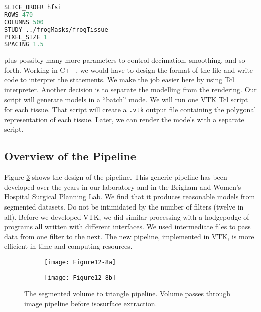 \begin{lstlisting}[language=TCL, caption={User specified parameters to control the elements of the pipeline.}]
SLICE_ORDER hfsi
ROWS 470
COLUMNS 500
STUDY ../frogMasks/frogTissue
PIXEL_SIZE 1
SPACING 1.5
\end{lstlisting}

plus possibly many more parameters to control decimation, smoothing, and so forth. Working in C++, we would have to design the format of the file and write code to interpret the statements. We make the job easier here by using Tcl interpreter. Another decision is to separate the modelling from the rendering. Our script will generate models in a ``batch'' mode. We will run one VTK Tcl script for each tissue. That script will create a \texttt{.vtk} output file containing the polygonal representation of each tissue. Later, we can render the models with a separate script.

\subsection{Overview of the Pipeline}

Figure \ref{fig:Figure12-8} shows the design of the pipeline. This generic pipeline has been developed over the years in our laboratory and in the Brigham and Women's Hospital Surgical Planning Lab. We find that it produces reasonable models from segmented datasets. Do not be intimidated by the number of filters (twelve in all). Before we developed VTK, we did similar processing with a hodgepodge of programs all written with different interfaces. We used intermediate files to pass data from one filter to the next. The new pipeline, implemented in VTK, is more efficient in time and computing resources.

\begin{figure}[htb]
	\begin{subfigure}[h]{0.36\linewidth}
		\texttt{[image: Figure12-8a]}
		\caption*{}
		\label{fig:Figure12-8a}
	\end{subfigure}
	\hfill
	\begin{subfigure}[h]{0.36\linewidth}
		\texttt{[image: Figure12-8b]}
		\caption*{}
		\label{fig:Figure12-8b}
	\end{subfigure}
	\caption{The segmented volume to triangle pipeline. Volume passes through image pipeline before isosurface extraction.}\label{fig:Figure12-8}
\end{figure}

